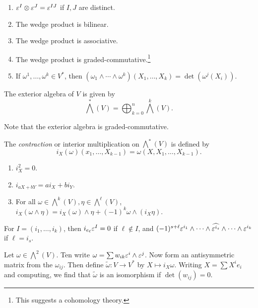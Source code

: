 \documentclass[twoside, 10pt]{article}
\begin{document}
    \begin{prop} \begin{enumerate} \item $\varepsilon^I \otimes \varepsilon^J = \varepsilon^{IJ}$ if
        $I,J$ are distinct.  \item The wedge product is bilinear.  \item The
        wedge product is associative.  \item The wedge product is
        graded-commutative.\footnote{This suggests a cohomology theory.} \item
If $\omega^1, \ldots, \omega^k \in V^*$, then $(\omega_1 \wedge \cdots \wedge
\omega^k)(X_1, \ldots, X_k) = \det(\omega^j(X_i))$.  \end{enumerate} \end{prop}

    \begin{defn} The exterior algebra of $V$ is given by \[ \bigwedge^*(V) =
    \bigoplus_{k=0}^n \bigwedge^k(V).\] \end{defn} Note that the exterior
    algebra is graded-commutative.

    \begin{defn} The \textit{contraction} or interior multiplication on
        $\bigwedge^*(V)$ is defined by \[ i_X(\omega)(x_1, \ldots, X_{k-1}) =
        \omega(X,X_1, \ldots, X_{k-1}). \] \end{defn}

    \begin{lem} \begin{enumerate} \item $i_X^2 = 0$.  \item $i_{aX+bY} = ai_X +
        bi_Y$.  \item For all $\omega \in \bigwedge^k(V), \eta \in
        \bigwedge^{\ell}(V)$, $i_X(\omega \wedge \eta) = i_X(\omega) \wedge
        \eta + (-1)^{k} \omega \wedge (i_X \eta)$.  \end{enumerate} \end{lem}

    \begin{exm} For $I = (i_1, \ldots, i_k)$, then $i_{e_\ell} \varepsilon^I = 0$ if
    $\ell \notin I$, and $(-1)^{s+\ell} \varepsilon^{i_1} \wedge \cdots \wedge
\widehat{\varepsilon^{i_s}} \wedge \cdots \wedge \varepsilon^{i_k}$ if $\ell = i_s$.  \end{exm}

    \begin{exm} Let $\omega \in \bigwedge^2(V)$. Ten write $\omega = \sum
        w_{ik} \varepsilon^i \wedge \varepsilon^j$. Now form an antisymmetric matrix from the
        $\omega_{ij}$. Then define $\widetilde{\omega}:V \to V^*$ by $X \mapsto
        i_X \omega$. Writing $X = \sum X^ie_i$ and computing, we find that
        $\widetilde{\omega}$ is an isomorphism if $\det (w_{ij}) = 0$.
    \end{exm}
\end{document}
